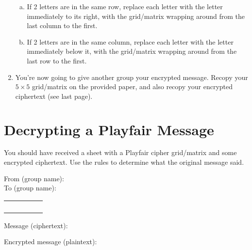 \documentclass[12pt]{amsart}
\theoremstyle{plain}
\theoremstyle{definition}
\theoremstyle{remark}
\begin{document}
\begin{enumerate}[1.]
\begin{enumerate}[a.]
			\item If 2 letters are in the same row, replace each letter with the letter immediately to its right, with the grid/matrix wrapping around from the last column to the first.\\
			\item If 2 letters are in the same column, replace each letter with the letter immediately below it, with the grid/matrix wrapping around from the last row to the first.\\
		\end{enumerate}
		\vspace{1.5in}
	\item You're now going to give another group your encrypted message.  Recopy your $5 \times 5$ grid/matrix on the provided paper, and also recopy your encrypted ciphertext (see last page).\\
\end{enumerate}

\section{Decrypting a Playfair Message}
You should have received a sheet with a Playfair cipher grid/matrix and some encrypted ciphertext.  Use the rules to determine what the original message said.

\newpage
From (group name): \underline{\hspace{3in}}\\

To (group name):   \underline{\hspace{3in}}\\
	\begin{center}
		\begin{tabular}{|p{.5in}|p{.5in}|p{.5in}|p{.5in}|p{.5in}|} \hline
		&&&&\\\hline
		&&&&\\\hline
		&&&&\\\hline
		&&&&\\\hline
		&&&&\\ \hline
		\end{tabular}
	\end{center}
	
Message (ciphertext):\\ \vspace{2.5in}

Encrypted message (plaintext):
\end{document}
